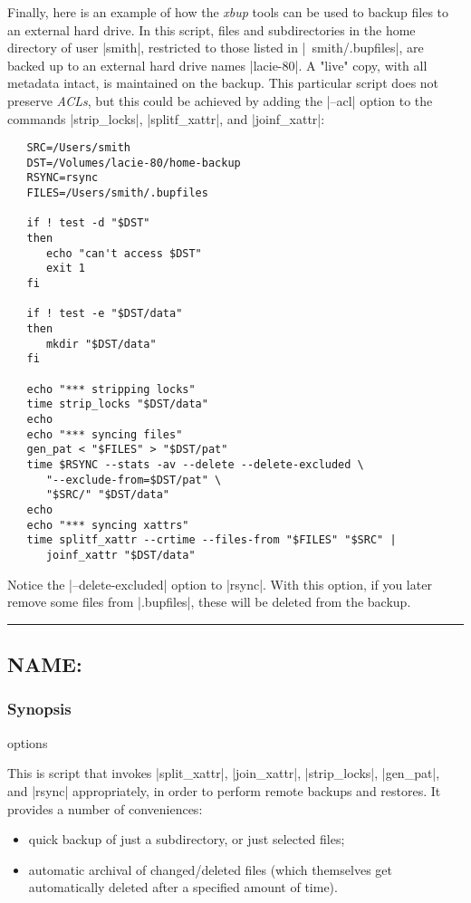 \documentclass[11pt]{article}
\def\sepline{\begin{center}\rule{5in}{1pt}\end{center}}
\newcommand\BackSlash{\char92}
\newcommand\LeftBrace{\char123}
\newcommand\RightBrace{\char125}
\newenvironment{Quote}{\let\\\BackSlash\let\{\LeftBrace\let\}\RightBrace}{}
\begin{document}
Finally, here is an example of how the \emph{xbup} tools can be used
to backup files to an external hard drive.
In this script, files and subdirectories in the home directory 
of user |smith|, restricted to those listed in |~smith/.bupfiles|, 
are backed up to an external hard drive names |lacie-80|.
A "live" copy, with all metadata intact, is maintained on the backup.
This particular script does not preserve \emph{ACLs},
but this could be achieved by adding the |--acl| option to
the commands |strip_locks|, |splitf_xattr|, and |joinf_xattr|:
\begin{Verbatim}
   SRC=/Users/smith
   DST=/Volumes/lacie-80/home-backup
   RSYNC=rsync
   FILES=/Users/smith/.bupfiles

   if ! test -d "$DST"
   then
      echo "can't access $DST"
      exit 1
   fi

   if ! test -e "$DST/data"
   then 
      mkdir "$DST/data"
   fi

   echo "*** stripping locks"
   time strip_locks "$DST/data"
   echo 
   echo "*** syncing files"
   gen_pat < "$FILES" > "$DST/pat"
   time $RSYNC --stats -av --delete --delete-excluded \
      "--exclude-from=$DST/pat" \
      "$SRC/" "$DST/data"
   echo 
   echo "*** syncing xattrs"
   time splitf_xattr --crtime --files-from "$FILES" "$SRC" | 
      joinf_xattr "$DST/data"
\end{Verbatim}
Notice the |--delete-excluded| option to |rsync|.
With this option, if you later remove some files from |.bupfiles|,
these will be deleted from the backup.


\sepline


\subsection*{NAME: \tt{}}

\subsubsection*{Synopsis}
\hypertarget{xbup-command}{}

\begin{Quote}
\begin{Vrb}
    options
\end{Vrb}
\end{Quote}



This is  script that invokes
|split_xattr|, |join_xattr|, |strip_locks|, 
|gen_pat|, and |rsync| appropriately,
in order to perform remote backups and restores.
It provides a number of conveniences:
\begin{itemize}
\item quick backup of just a subdirectory, or just selected files;
\item
automatic archival of changed/deleted files (which themselves
    get automatically deleted after a specified amount of time).
\end{itemize}
\end{document}
